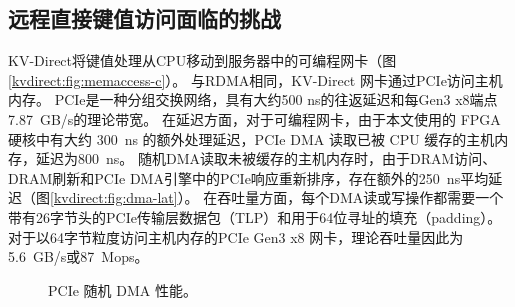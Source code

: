 \subsection{远程直接键值访问面临的挑战}
\label{kvdirect:sec:challenge}

KV-Direct将键值处理从CPU移动到服务器中的可编程网卡（图\ref {kvdirect:fig:memaccess-c}）。
与RDMA相同，KV-Direct 网卡通过PCIe访问主机内存。 PCIe是一种分组交换网络，具有大约500 ns的往返延迟和每Gen3 x8端点7.87~GB/s的理论带宽。
在延迟方面，对于可编程网卡，由于本文使用的 FPGA 硬核中有大约 300~ns 的额外处理延迟，PCIe DMA 读取已被 CPU 缓存的主机内存，延迟为800~ns。
随机DMA读取未被缓存的主机内存时，由于DRAM访问、DRAM刷新和PCIe DMA引擎中的PCIe响应重新排序，存在额外的250~ns平均延迟（图\ref {kvdirect:fig:dma-lat}）。
在吞吐量方面，每个DMA读或写操作都需要一个带有26字节头的PCIe传输层数据包（TLP）和用于64位寻址的填充（padding）。
对于以64字节粒度访问主机内存的PCIe Gen3 x8 网卡，理论吞吐量因此为5.6~GB/s或87~Mops。

\begin{figure}[t]
	\centering
	\caption{PCIe 随机 DMA 性能。}
	\label{kvdirect:fig:dma-perf}
\end{figure}

